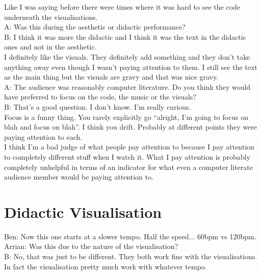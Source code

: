 Like I was saying before there were times where it was hard to see the code underneath the visualisations.\\

A: Was this during the aesthetic or didactic performance?\\

B: I think it was more the didactic and I think it was the text in the didactic ones and not in the aesthetic.\\

I definitely like the visuals. They definitely add something and they don't take anything away even though I wasn't paying attention to them. I still see the text as the main thing but the visuals are gravy and that was nice gravy.\\

A: The audience was reasonably computer literature. Do you think they would have preferred to focus on the code, the music or the visuals?\\

B: That's a good question. I don't know. I'm really curious.\\

Focus is a funny thing. You rarely explicitly go ``alright, I'm going to focus on blah and focus on blah''. I think you drift. Probably at different points they were paying attention to each.\\

I think I'm a bad judge of what people pay attention to because I pay attention to completely different stuff when I watch it. What I pay attention is probably completely unhelpful in terms of an indicator for what even a computer literate audience member would be paying attention to.\\

\section*{Didactic Visualisation}

Ben: Now this one starts at a slower tempo. Half the speed... 60bpm vs 120bpm.\\

Arrian: Was this due to the nature of the visualisation?\\

B: No, that was just to be different. They both work fine with the visualisations. In fact the visualisation pretty much work with whatever tempo.\\

